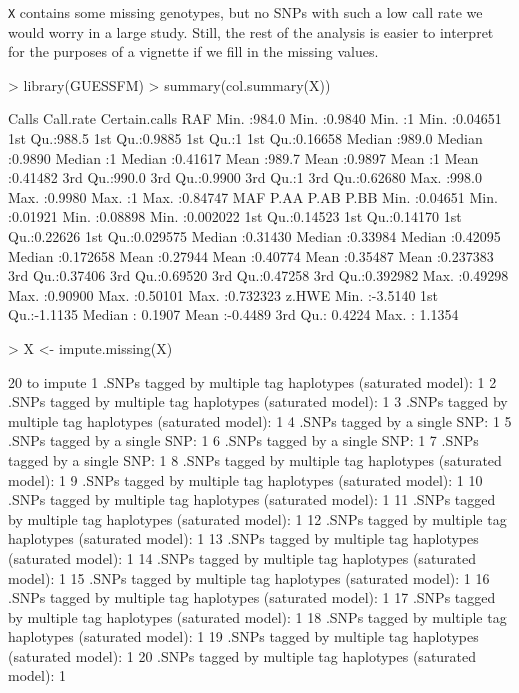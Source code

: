 \documentclass[11pt]{article}
\begin{document}
\texttt{X} contains some missing genotypes, but no SNPs with such a low call
rate we would worry in a large study. Still, the rest of the analysis
is easier to interpret for the purposes of a vignette if we fill in
the missing values.

\begin{Schunk}
\begin{Sinput}
> library(GUESSFM)
> summary(col.summary(X))
\end{Sinput}
\begin{Soutput}
     Calls         Call.rate      Certain.calls      RAF         
 Min.   :984.0   Min.   :0.9840   Min.   :1     Min.   :0.04651  
 1st Qu.:988.5   1st Qu.:0.9885   1st Qu.:1     1st Qu.:0.16658  
 Median :989.0   Median :0.9890   Median :1     Median :0.41617  
 Mean   :989.7   Mean   :0.9897   Mean   :1     Mean   :0.41482  
 3rd Qu.:990.0   3rd Qu.:0.9900   3rd Qu.:1     3rd Qu.:0.62680  
 Max.   :998.0   Max.   :0.9980   Max.   :1     Max.   :0.84747  
      MAF               P.AA              P.AB              P.BB         
 Min.   :0.04651   Min.   :0.01921   Min.   :0.08898   Min.   :0.002022  
 1st Qu.:0.14523   1st Qu.:0.14170   1st Qu.:0.22626   1st Qu.:0.029575  
 Median :0.31430   Median :0.33984   Median :0.42095   Median :0.172658  
 Mean   :0.27944   Mean   :0.40774   Mean   :0.35487   Mean   :0.237383  
 3rd Qu.:0.37406   3rd Qu.:0.69520   3rd Qu.:0.47258   3rd Qu.:0.392982  
 Max.   :0.49298   Max.   :0.90900   Max.   :0.50101   Max.   :0.732323  
     z.HWE        
 Min.   :-3.5140  
 1st Qu.:-1.1135  
 Median : 0.1907  
 Mean   :-0.4489  
 3rd Qu.: 0.4224  
 Max.   : 1.1354  
\end{Soutput}
\begin{Sinput}
> X <- impute.missing(X)
\end{Sinput}
\begin{Soutput}
20 to impute
1 .SNPs tagged by multiple tag haplotypes (saturated model): 1
2 .SNPs tagged by multiple tag haplotypes (saturated model): 1
3 .SNPs tagged by multiple tag haplotypes (saturated model): 1
4 .SNPs tagged by a single SNP: 1
5 .SNPs tagged by a single SNP: 1
6 .SNPs tagged by a single SNP: 1
7 .SNPs tagged by a single SNP: 1
8 .SNPs tagged by multiple tag haplotypes (saturated model): 1
9 .SNPs tagged by multiple tag haplotypes (saturated model): 1
10 .SNPs tagged by multiple tag haplotypes (saturated model): 1
11 .SNPs tagged by multiple tag haplotypes (saturated model): 1
12 .SNPs tagged by multiple tag haplotypes (saturated model): 1
13 .SNPs tagged by multiple tag haplotypes (saturated model): 1
14 .SNPs tagged by multiple tag haplotypes (saturated model): 1
15 .SNPs tagged by multiple tag haplotypes (saturated model): 1
16 .SNPs tagged by multiple tag haplotypes (saturated model): 1
17 .SNPs tagged by multiple tag haplotypes (saturated model): 1
18 .SNPs tagged by multiple tag haplotypes (saturated model): 1
19 .SNPs tagged by multiple tag haplotypes (saturated model): 1
20 .SNPs tagged by multiple tag haplotypes (saturated model): 1


\end{Soutput}
\end{Schunk}
\end{document}
